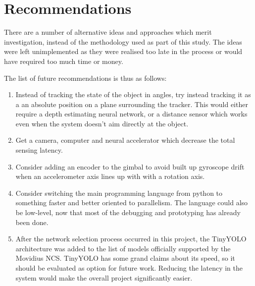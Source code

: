 \chapter{Recommendations}

There are a number of alternative ideas and approaches which merit investigation, instead of the methodology used as part of this study. The ideas were left unimplemented as they were realised too late in the process or would have required too much time or money.

The list of future recommendations is thus as follows:

\begin{enumerate}
	\item Instead of tracking the state of the object in angles, try instead tracking it as a an absolute position on a plane surrounding the tracker. This would either require a depth estimating neural network, or a distance sensor which works even when the system doesn't aim directly at the object.
	\item Get a camera, computer and neural accelerator which decrease the total sensing latency.
	\item Consider adding an encoder to the gimbal to avoid built up gyroscope drift when an accelerometer axis lines up with with a rotation axis.
	\item Consider switching the main programming language from python to something faster and better oriented to parallelism. The language could also be low-level, now that most of the debugging and prototyping has already been done.
	\item After the network selection process occurred in this project, the TinyYOLO architecture was added to the list of models officially supported by the Movidius NCS. TinyYOLO has some grand claims about its speed, so it should be evaluated as option for future work. Reducing the latency in the system would make the overall project significantly easier.
\end{enumerate}


